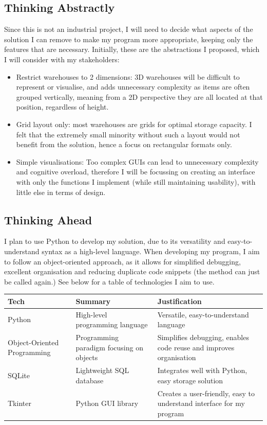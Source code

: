 \subsection{Thinking Abstractly}
Since this is not an industrial project, I will need to decide what aspects of the solution I can remove to make my program more appropriate, keeping only the features that are necessary. Initially, these are the abstractions I proposed, which I will consider with my stakeholders:

\begin{itemize}
    \item Restrict warehouses to 2 dimensions: 3D warehouses will be difficult to represent or visualise, and adds unnecessary complexity as items are often grouped vertically, meaning from a 2D perspective they are all located at that position, regardless of height.

    \item Grid layout only: most warehouses are grids for optimal storage capacity. I felt that the extremely small minority without such a layout would not benefit from the solution, hence a focus on rectangular formats only.

    \item Simple visualisations: Too complex GUIs can lead to unnecessary complexity and cognitive overload, therefore I will be focussing on creating an interface with only the functions I implement (while still maintaining usability), with little else in terms of design.
\end{itemize}

\subsection{Thinking Ahead}

I plan to use Python to develop my solution, due to its versatility and easy-to-understand syntax as a high-level language. When developing my program, I aim to follow an object-oriented approach, as it allows for simplified debugging, excellent organisation and reducing duplicate code snippets (the method can just be called again.) See below for a table of technologies I aim to use.


\begin{table}[h]
\centering
\begin{tabular}{|p{3cm}|p{5cm}|p{6cm}|}
\hline
\textbf{Tech} & \textbf{Summary} & \textbf{Justification} \\
\hline
Python & High-level programming language & Versatile, easy-to-understand language \\
\hline
Object-Oriented Programming & Programming paradigm focusing on objects & Simplifies debugging, enables code reuse and improves organisation \\
\hline
SQLite & Lightweight SQL database & Integrates well with Python, easy storage solution \\
\hline
Tkinter & Python GUI library & Creates a user-friendly, easy to understand interface for my program\\
\hline
\end{tabular}
\end{table}

